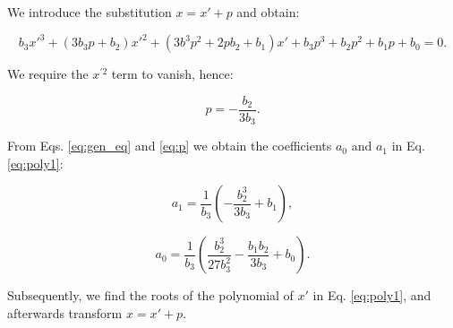 \documentclass{article}
\begin{document}
We introduce the substitution $x=x'+p$ and obtain:

\begin{equation}
  b_3x'^3+\left(3b_3p+b_2\right)x'^2+\left(3b^3p^2+2pb_2+b_1\right)x'+b_3p^3+b_2p^2+b_1p+b_0=0.
  \label{eq:gen_eq}
\end{equation}

We require the $x^{'2}$ term to vanish, hence:

\begin{equation}
  p=-\frac{b_2}{3b_3}.
  \label{eq:p}
\end{equation}

From Eqs. \eqref{eq:gen_eq} and \eqref{eq:p} we obtain the coefficients $a_0$ and $a_1$ in Eq. \eqref{eq:poly1}:

\begin{equation}
  a_1=\frac{1}{b_3}\left(-\frac{b_2^3}{3b_3}+b_1\right),
\end{equation}

\begin{equation}
  a_0=\frac{1}{b_3}\left(\frac{b_2^3}{27b_3^2}-\frac{b_1b_2}{3b_3}+b_0\right).
\end{equation}

Subsequently, we find the roots of the polynomial of $x'$ in Eq. \eqref{eq:poly1}, and afterwards transform $x=x'+p$.
\end{document}
